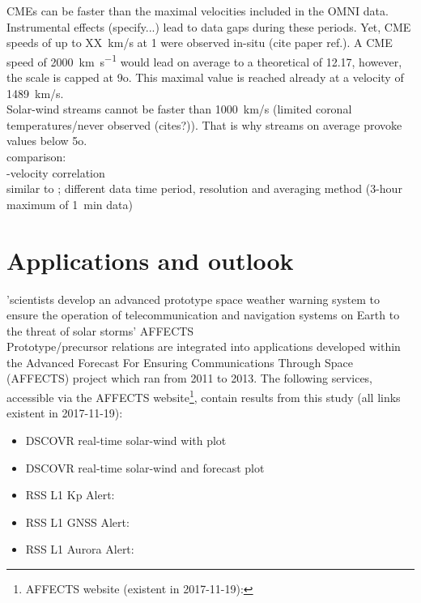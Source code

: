 CMEs can be faster than the maximal velocities included in the OMNI data. Instrumental effects (specify...) lead to data gaps during these periods. Yet, CME speeds of up to XX~km/s at \SI{1}{\au} were observed in-situ (cite paper ref.). A CME speed of \SI{2000}{\km\per\s} would lead on average to a theoretical \Kp{} of 12.17, however, the \Kp{} scale is capped at 9o. This maximal value is reached already at a velocity of 1489~km/s.\\

Solar-wind streams cannot be faster than 1000~km/s (limited coronal temperatures/never observed (cites?)). That is why streams on average provoke \Kp{} values below 5o.\\

comparison:\\
\Kp-velocity correlation\\
similar to \citet{Elliott2013}; different data time period, resolution and averaging method (3-hour maximum of 1~min data)\\


\section{Applications and outlook}

'scientists develop an advanced prototype space weather warning system to ensure the operation of telecommunication and navigation systems on Earth to the threat of solar storms' AFFECTS\\

Prototype/precursor relations are integrated into applications developed within the Advanced Forecast For Ensuring Communications Through Space (\mbox{AFFECTS}) project which ran from 2011 to 2013. The following services, accessible via the \mbox{AFFECTS} website\footnote{AFFECTS website (existent in 2017-11-19): }, contain results from this \Kp{} study (all links existent in 2017-11-19):
\begin{itemize}
	\item DSCOVR real-time solar-wind with \Kp{} plot 
	\item DSCOVR real-time solar-wind and \Kp{} forecast plot 
	\item RSS L1 Kp Alert: 
	\item RSS L1 GNSS Alert: 
	\item RSS L1 Aurora Alert: 
\end{itemize}

